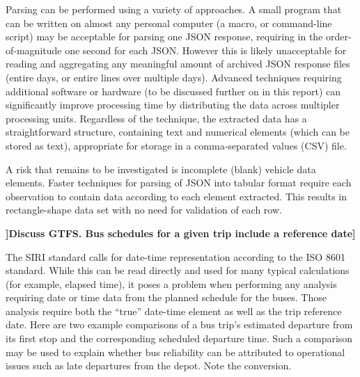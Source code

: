 \documentclass[12pt]{report}
\begin{document}
Parsing can be performed using a variety of approaches.  A small program that can be written on almost any personal computer (a macro, or command-line script) may be acceptable for parsing one JSON response, requiring in the order-of-magnitude one second for each JSON.  However this is likely unacceptable for reading and aggregating any meaningful amount of archived JSON response files (entire days, or entire lines over multiple days).  Advanced techniques requiring additional software or hardware (to be discussed further on in this report) can significantly improve processing time by distributing the data across multipler processing units.  Regardless of the technique, the extracted data has a straightforward structure, containing text and numerical elements (which can be stored as text), appropriate for storage in a comma-separated values (CSV) file.

A risk that remains to be investigated is incomplete (blank) vehicle data elements.  Faster techniques for parsing of JSON into tabular format require each observation to contain data according to each element extracted.  This results in rectangle-shape data set with no need for validation of each row.

\textbf{]Discuss GTFS. Bus schedules for a given trip include a reference date]}

The SIRI standard calls for date-time representation according to the ISO 8601 standard.  While this can be read directly and used for many typical calculations (for example, elapsed time), it poses a problem when performing any analysis requiring date or time data from the planned schedule for the buses.  Those analysis require both the “true'' date-time element as well as the trip reference date.  Here are two example comparisons of a bus trip's estimated departure from its first stop and the corresponding scheduled departure time. Such a comparison may be used to explain whether bus reliability can be attributed to operational issues such as late departures from the depot.  Note the conversion.

\vspace{0.5cm}

\end{document}
